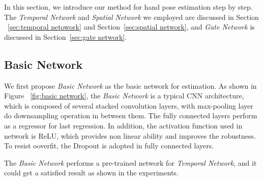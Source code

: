 \documentclass[journal,comsoc]{IEEEtran}
\begin{document}
In this section, we introduce our method for hand pose estimation step by step.
The \emph{Temporal Network} and \emph{Spatial Network} we employed are discussed in Section
~\ref{sec:temporal netowork} and Section~\ref{sec:spatial network}, and \emph{Gate Network} is
discussed in Section~\ref{sec:gate network}.



\subsection{Basic Network}\label{sec:basic network}
We first propose \emph{Basic Network} as the basic network for estimation. As shown in Figure
~\ref{fig:basic network}, the \emph{Basic Network} is a typical CNN architecture, which is composed
of several stacked convolution layers, with max-pooling layer do downsampling operation in between
them. The fully connected layers perform as a regressor for last regression. In addition, the activation
function used in network is ReLU, which provides non linear ability and improves the robustness. To resist
ooverfit, the Dropout is adopted in fully connected layers.

The \emph{Basic Network} performs a pre-trained network for \emph{Temporal Network}, and it could get a
satisfied result as shown in the experiments.
\end{document}
